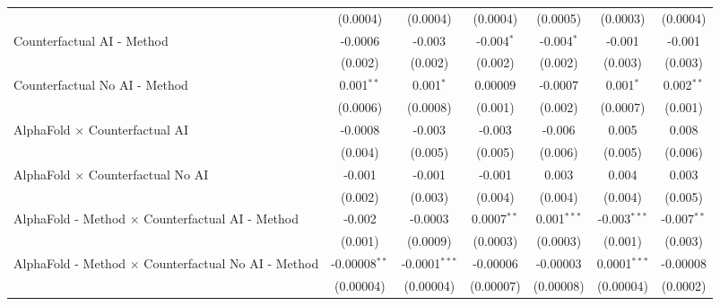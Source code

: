 \begin{tabular}{lcccccc}
                                                              & (0.0004)        & (0.0004)        & (0.0004)      & (0.0005)      & (0.0003)       & (0.0004)\\   
   Counterfactual AI - Method                                 & -0.0006         & -0.003          & -0.004$^{*}$  & -0.004$^{*}$  & -0.001         & -0.001\\   
                                                              & (0.002)         & (0.002)         & (0.002)       & (0.002)       & (0.003)        & (0.003)\\   
   Counterfactual No AI - Method                              & 0.001$^{**}$    & 0.001$^{*}$     & 0.00009       & -0.0007       & 0.001$^{*}$    & 0.002$^{**}$\\   
                                                              & (0.0006)        & (0.0008)        & (0.001)       & (0.002)       & (0.0007)       & (0.001)\\   
   AlphaFold $\times$ Counterfactual AI                       & -0.0008         & -0.003          & -0.003        & -0.006        & 0.005          & 0.008\\   
                                                              & (0.004)         & (0.005)         & (0.005)       & (0.006)       & (0.005)        & (0.006)\\   
   AlphaFold $\times$ Counterfactual No AI                    & -0.001          & -0.001          & -0.001        & 0.003         & 0.004          & 0.003\\   
                                                              & (0.002)         & (0.003)         & (0.004)       & (0.004)       & (0.004)        & (0.005)\\   
   AlphaFold - Method $\times$ Counterfactual AI - Method     & -0.002          & -0.0003         & 0.0007$^{**}$ & 0.001$^{***}$ & -0.003$^{***}$ & -0.007$^{**}$\\   
                                                              & (0.001)         & (0.0009)        & (0.0003)      & (0.0003)      & (0.001)        & (0.003)\\   
   AlphaFold - Method $\times$ Counterfactual No AI - Method  & -0.00008$^{**}$ & -0.0001$^{***}$ & -0.00006      & -0.00003      & 0.0001$^{***}$ & -0.00008\\   
                                                              & (0.00004)       & (0.00004)       & (0.00007)     & (0.00008)     & (0.00004)      & (0.0002)\\   

\end{tabular}
